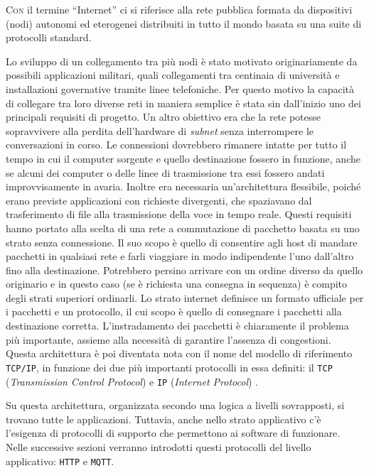 \lettrine{C}{on} il termine ``Internet'' ci si riferisce alla rete pubblica formata da dispositivi (nodi) autonomi ed eterogenei distribuiti in tutto il mondo basata su una suite di protocolli standard.

Lo sviluppo di un collegamento tra più nodi è stato motivato originariamente da possibili applicazioni militari, quali collegamenti tra centinaia di università e installazioni governative tramite linee telefoniche.
Per questo motivo la capacità di collegare tra loro diverse reti in maniera semplice è stata sin dall'inizio uno dei principali requisiti di progetto.
Un altro obiettivo era che la rete potesse sopravvivere alla perdita dell'hardware di \textit{subnet} senza interrompere le conversazioni in corso.
Le connessioni dovrebbero rimanere intatte per tutto il tempo in cui il computer sorgente e quello destinazione fossero in funzione, anche se alcuni dei computer o delle linee di trasmissione tra essi fossero andati improvvisamente in avaria.
Inoltre era necessaria un'architettura flessibile, poiché erano previste applicazioni con richieste divergenti, che spaziavano dal trasferimento di file alla trasmissione della voce in tempo reale.
Questi requisiti hanno portato alla scelta di una rete a commutazione di pacchetto basata su uno strato senza connessione.
Il suo scopo è quello di consentire agli host di mandare pacchetti in qualsiasi rete e farli viaggiare in modo indipendente l'uno dall'altro fino alla destinazione.
Potrebbero persino arrivare con un ordine diverso da quello originario e in questo caso (se è richiesta una consegna in sequenza) è compito degli strati superiori ordinarli.
Lo strato internet definisce un formato ufficiale per i pacchetti e un protocollo, il cui scopo è quello di consegnare i pacchetti alla destinazione corretta.
L'instradamento dei pacchetti è chiaramente il problema più importante, assieme alla necessità di garantire l'assenza di congestioni.
Questa architettura è poi diventata nota con il nome del modello di riferimento \verb+TCP/IP+, in funzione dei due più importanti protocolli in essa definiti: il \verb+TCP+ (\textit{Transmission Control Protocol}) e \verb+IP+ (\textit{Internet Protocol}) \cite{TCPIP}.

Su questa architettura, organizzata secondo una logica a livelli sovrapposti, si trovano tutte le applicazioni.
Tuttavia, anche nello strato applicativo c'è l'esigenza di protocolli di supporto che permettono ai software di funzionare.
Nelle successive sezioni verranno introdotti questi protocolli del livello applicativo: \verb+HTTP+ e \verb+MQTT+.

